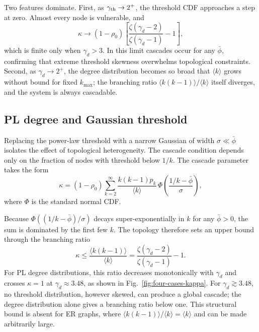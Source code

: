 \documentclass[]{revtex4-2}
\begin{document}
Two features dominate. First, as $\gamma_{\rm th}\to2^+$, the threshold CDF approaches a step at zero. Almost every node is vulnerable, and
\begin{equation}
    \kappa\to (1-\rho_0)\left[\frac{\zeta(\gamma_d-2)}{\zeta(\gamma_d-1)}-1\right],
\end{equation}
which is finite only when $\gamma_d>3$. In this limit cascades occur for any $\bar\phi$, confirming that extreme threshold skewness overwhelms topological constraints. Second, as $\gamma_d\to2^+$, the degree distribution becomes so broad that $\langle k\rangle$ grows without bound for fixed $k_{\max}$; the branching ratio $\langle k(k-1)\rangle/\langle k\rangle$ itself diverges, and the system is always cascadable.

\subsection{PL degree and Gaussian threshold}
\label{sec:pl-gauss}

Replacing the power-law threshold with a narrow Gaussian of width $\sigma\ll\bar\phi$ isolates the effect of topological heterogeneity. The cascade condition depends only on the fraction of nodes with threshold below $1/k$. The cascade parameter takes the form
\begin{equation}
    \kappa = (1-\rho_0)\sum_{k=2}^\infty \frac{k(k-1)p_k}{\langle k\rangle}\,
    \Phi\!\left(\frac{1/k-\bar\phi}{\sigma}\right),
\end{equation}
where $\Phi$ is the standard normal CDF.

Because $\Phi((1/k-\bar\phi)/\sigma)$ decays super-exponentially in $k$ for any $\bar\phi>0$, the sum is dominated by the first few $k$. The topology therefore sets an upper bound through the branching ratio
\begin{equation}
    \kappa \le \frac{\langle k(k-1)\rangle}{\langle k\rangle}
    = \frac{\zeta(\gamma_d-2)}{\zeta(\gamma_d-1)} - 1 .
\end{equation}
For PL degree distributions, this ratio decreases monotonically with $\gamma_d$ and crosses $\kappa=1$ at $\gamma_d\approx3.48$, as shown in Fig.~\ref{fig:four-cases-kappa}. For $\gamma_d\gtrsim3.48$, no threshold distribution, however skewed, can produce a global cascade; the degree distribution alone gives a branching ratio below one. This structural bound is absent for ER graphs, where $\langle k(k-1)\rangle/\langle k\rangle = \langle k\rangle$ and can be made arbitrarily large.
\end{document}
